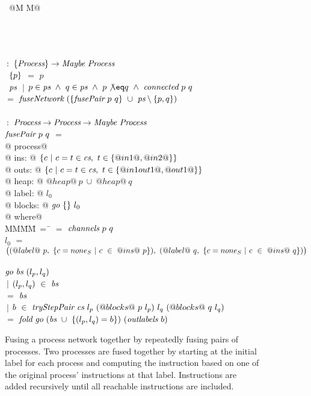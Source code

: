 
\begin{figure}

\begin{tabbing}
~@M M@   \TABDEF \kill

 \\
 \\
\\
 \> $~:$ \> $\{ \textit{Process} \} \to  \textit{Maybe}~\textit{Process}$ \\
~$\{ p \}$ \> $=$ \> $p$ \\
~$\textit{ps}$
    \> $~|$      \> $p \in \ti{ps} ~\wedge~ q \in \ti{ps} ~\wedge~ p \not\eq q ~\wedge~ \ti{connected}~p~q$ \\
    \> $=$ \> $\textit{fuseNetwork}~(\{ \textit{fusePair}~p~q \}~\cup~\textit{ps} \setminus \{ p,q \})$ \\
\\
 \> $~:$ \> $\textit{Process} \to \textit{Process} \to  \textit{Maybe}~\textit{Process}$ \\
$\textit{fusePair}~p~q$ \> $=$ \\
@    process@ \\
@        ins: @ $\{ c~|~c=t \in \textit{cs},~t \in \{ @in1@,@in2@ \} \} $ \\
@       outs: @ $\{ c~|~c=t \in \textit{cs},~t \in \{ @in1out1@,@out1@ \} \} $ \\
@       heap: @ $@heap@~p~\cup~@heap@~q$ \\
@      label: @ $l_0$ \\
@     blocks: @ $\textit{go}~\{  \}~l_0$ \\
@ where@ \\
MM\=MM\=~=~\=\kill
 \> \cs \> $=$ \> $\textit{channels}~p~q$ \\
 \> $l_0$   \> $=$ \> $
      \big( 
      (@label@~p,~\{ c=none_S~|~c~\in~@ins@~p \}),~
      (@label@~q,~\{ c=none_S~|~c~\in~@ins@~q \})
      \big)$ \\
 \\
 \> $\textit{go}~\textit{bs}~(l_p,l_q)$ \\
 \> \> $~|$ \> $(l_p,l_q)~\in~\textit{bs}$ \\
 \> \> $=$  \> $\textit{bs}$ \\
 \> \> $~|$ \>
        $b~\in~\textit{tryStepPair}~\textit{cs}~l_p~(@blocks@~p~l_p)~l_q~(@blocks@~q~l_q)$ \\ 
 \> \> $=$ \> $\textit{fold}~\textit{go}~(\textit{bs}~\cup~\{ (l_p,l_q)=b \})~(\textit{outlabels}~b)$ \\
\end{tabbing}

\caption{Fusing a process network together by repeatedly fusing pairs of processes.
Two processes are fused together by starting at the initial label for each process and computing the instruction based on one of the original process' instructions at that label.
Instructions are added recursively until all reachable instructions are included.
}
\label{fig:Fusion:Def:Top}
\end{figure}



